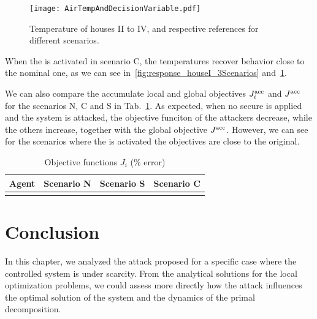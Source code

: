 \documentclass[../main.tex]{subfiles}
\begin{document}
\begin{figure}[h]
  \centering
  \texttt{[image: AirTempAndDecisionVariable.pdf]}
\caption{Temperature of houses II to IV, and respective references for different scenarios. }\label{fig:response_housesII_to_IV_3Scenarios}
\end{figure}

When the \rpdmpcss{} is activated in scenario C, the temperatures recover behavior close to the nominal one, as we can see in~\ref{fig:response_houseI_3Scenarios} and~\ref{fig:response_housesII_to_IV_3Scenarios}.


We can also compare the accumulate local and global objectives $J_{i}^{\text{acc}}$ and $J^{\text{acc}}$ for the scenarios N, C and S in Tab.~\ref{tab:eq_costsGlobalLocal}.
As expected, when no secure \dmpc{} is applied and the system is attacked, the objective funciton of the attackers decrease, while the others increase, together with the global objective $J^{\text{acc}}$.
However, we can see for the scenarios where the \rpdmpcss{} is activated the objectives are close to the original.

\begin{table}[h]
  \centering
  \caption{Objective functions $J_{i}$ (\% error)}\label{tab:eq_costsGlobalLocal}
  \begin{tabular}[t]{cccc}
    \toprule
    Agent  & Scenario N& Scenario S & Scenario C\\
    \midrule
    \\
    \bottomrule
  \end{tabular}
\end{table}

\section{Conclusion}\label{sec:conclusion}
In this chapter, we analyzed the \fdi{} attack proposed for a specific case where the controlled system is under scarcity.
From the analytical solutions for the local optimization problems, we could assess more directly how the attack influences the optimal solution of the system and the dynamics of the primal decomposition.
\end{document}
